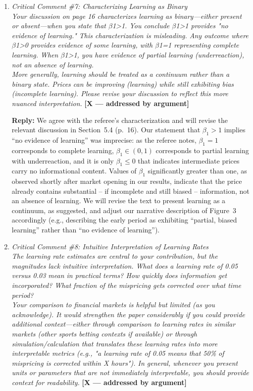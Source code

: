 \documentclass[letterpaper,12pt]{article}
\newcounter{b}
\newcommand{\argX}{\textcolor{green!55!black}{\textbf{[X --- addressed by argument]}}}
\newcommand{\Reply}[1]{\par\noindent\textbf{Reply:} #1}
\begin{document}
\begin{enumerate}
\item \textit{Critical Comment \#7: Characterizing Learning as Binary\\[6pt]
Your discussion on page 16 characterizes learning as binary—either present or absent—when you state that $\beta$1>1.
You conclude $\beta$1>1 provides "no evidence of learning." This characterization is misleading. Any outcome where $\beta$1>0 provides evidence of some learning, with $\beta$1=1 representing complete learning. When $\beta$1>1, you have evidence of partial learning (underreaction), not an absence of learning.\\[6pt]
More generally, learning should be treated as a continuum rather than a binary state. Prices can be improving (learning) while still exhibiting bias (incomplete learning). Please revise your discussion to reflect this more nuanced interpretation.} \argX

\Reply{We agree with the referee's characterization and will revise the relevant discussion in Section~5.4 (p.~16). Our statement that $\beta_1 > 1$ implies ``no evidence of learning'' was imprecise: as the referee notes, $\beta_1 = 1$ corresponds to complete learning, $\beta_1 \in (0,1)$ corresponds to partial learning with underreaction, and it is only $\beta_1 \le 0$ that indicates intermediate prices carry no informational content. Values of $\beta_1$ significantly greater than one, as observed shortly after market opening in our results, indicate that the price already contains substantial -- if incomplete and still biased -- information, not an absence of learning. We will revise the text to present learning as a continuum, as suggested, and adjust our narrative description of Figure~3 accordingly (e.g., describing the early period as exhibiting ``partial, biased learning'' rather than ``no evidence of learning'').}

\item \textit{Critical Comment \#8: Intuitive Interpretation of Learning Rates\\[6pt]
The learning rate estimates are central to your contribution, but the magnitudes lack intuitive interpretation. What does a learning rate of 0.05 versus 0.03 mean in practical terms? How quickly does information get incorporated? What fraction of the mispricing gets corrected over what time period?\\[6pt]
Your comparison to financial markets is helpful but limited (as you acknowledge). It would strengthen the paper considerably if you could provide additional context—either through comparison to learning rates in similar markets (other sports betting contexts if available) or through simulation/calculation that translates these learning rates into more interpretable metrics (e.g., "a learning rate of 0.05 means that 50\% of mispricing is corrected within X hours"). In general, whenever you present units or parameters that are not immediately interpretable, you should provide context for readability.} \argX


\end{enumerate}
\end{document}
